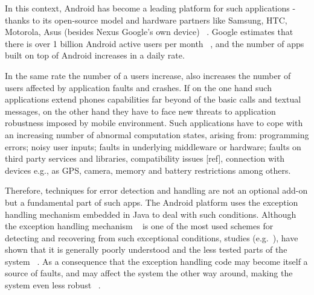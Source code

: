 \documentclass[conference]{IEEEtran}
\begin{document}
In this context, Android has become a leading platform for such applications - thanks to its open-source 
model and hardware partners like Samsung, HTC, Motorola, Asus (besides Nexus Google's
 own device) ~\cite{gartner}.  Google estimates that there is over 1 billion Android active users per month ~\cite{googleio},
and the number of apps built on top of Android increases in a daily rate.




In the same rate the number of a users increase, also increases 
the number of users affected by application faults and crashes.
If on the one hand such applications extend phones capabilities 
far beyond of the basic calls and textual messages, on the other hand
they have to face new threats to application robustness imposed by mobile environment.
Such applications have to cope with an increasing number of abnormal
computation states, arising from: programming errors;
 noisy user inputs; faults in underlying middleware or hardware; 
faults on third party services and libraries, compatibility issues [ref], 
connection with devices e.g., as GPS, camera, memory and battery restrictions
among others.



Therefore, techniques for error detection and handling are not  an optional add-on but a 
fundamental part of such apps.
The Android platform uses the exception handling mechanism embedded
 in Java to deal with such conditions. Although the exception handling mechanism
~\cite{goodenough1975exception} is one of the most used schemes for
detecting and recovering from such exceptional conditions, studies (e.g.~\cite{miller1997issues,Robil00,shah2010understanding, garcia2007extracting,garcia2001comparative,cabral2007exception,coelho2011unveiling}),
have shown that it is generally poorly understood and the less tested parts of the system ~\cite{coelho2011unveiling}.
As a consequence that the exception handling code may become itself a source of faults, 
and may affect the system the other way around, making the system even less robust ~\cite{robillard2003static,coelho2011unveiling}.
\end{document}
